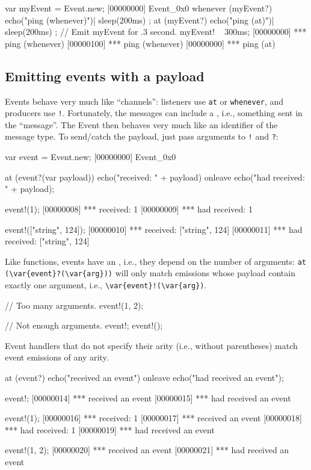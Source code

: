 \begin{urbiunchecked}[firstnumber=1]
var myEvent = Event.new;
[00000000] Event_0x0
whenever (myEvent?)
{
  echo("ping (whenever)")|
  sleep(200ms)
};
at (myEvent?)
{
  echo("ping (at)")|
  sleep(200ms)
};
// Emit myEvent for .3 second.
myEvent! ~ 300ms;
[00000000] *** ping (whenever)
[00000100] *** ping (whenever)
[00000000] *** ping (at)
\end{urbiunchecked}

\subsection{Emitting events with a payload}
\label{sec:tut:events:payload}

Events behave very much like ``channels'': listeners use \lstinline|at| or
\lstinline|whenever|, and producers use \lstinline|!|.  Fortunately, the
messages can include a , i.e., something sent in the
``message''.  The Event then behaves very much like an identifier of the
message type.  To send/catch the payload, just pass arguments to
\lstinline|!| and \lstinline|?|:

\begin{urbiscript}
var event = Event.new;
[00000000] Event_0x0

at (event?(var payload))
  echo("received: " + payload)
onleave
  echo("had received: " + payload);

event!(1);
[00000008] *** received: 1
[00000009] *** had received: 1

event!(["string", 124]);
[00000010] *** received: ["string", 124]
[00000011] *** had received: ["string", 124]
\end{urbiscript}

Like functions, events have an , i.e., they depend on the number
of arguments: \lstinline|at (\var{event}?(\var{arg}))| will only match
emissions whose payload contain exactly one argument, i.e.,
\lstinline|\var{event}!(\var{arg})|.

\begin{urbiscript}
// Too many arguments.
event!(1, 2);

// Not enough arguments.
event!;
event!();
\end{urbiscript}

Event handlers that do not specify their arity (i.e., without parentheses)
match event emissions of any arity.

\begin{urbiscript}
at (event?)
  echo("received an event")
onleave
  echo("had received an event");

event!;
[00000014] *** received an event
[00000015] *** had received an event

event!(1);
[00000016] *** received: 1
[00000017] *** received an event
[00000018] *** had received: 1
[00000019] *** had received an event

event!(1, 2);
[00000020] *** received an event
[00000021] *** had received an event
\end{urbiscript}

